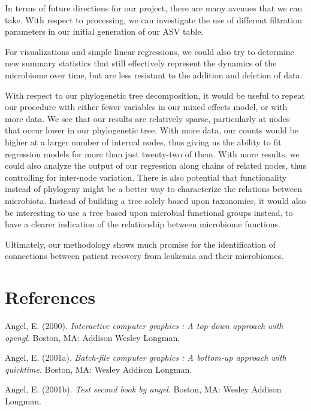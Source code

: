 \documentclass[12pt,twoside]{dukestatscithesis}
\begin{document}
In terms of future directions for our project, there are many avenues
that we can take. With respect to processing, we can investigate the use
of different filtration parameters in our initial generation of our ASV
table.

For visualizations and simple linear regressions, we could also try to
determine new summary statistics that still effectively represent the
dynamics of the microbiome over time, but are less resistant to the
addition and deletion of data.

With respect to our phylogenetic tree decomposition, it would be useful
to repeat our procedure with either fewer variables in our mixed effects
model, or with more data. We see that our results are relatively sparse,
particularly at nodes that occur lower in our phylogenetic tree. With
more data, our counts would be higher at a larger number of internal
nodes, thus giving us the ability to fit regression models for more than
just twenty-two of them. With more results, we could also analyze the
output of our regression along chains of related nodes, thus controlling
for inter-node variation. There is also potential that functionality
instead of phylogeny might be a better way to characterize the relations
between microbiota. Instead of building a tree solely based upon
taxonomies, it would also be interesting to use a tree based upon
microbial functional groups instead, to have a clearer indication of the
relationship between microbiome functions.

Ultimately, our methodology shows much promise for the identification of
connections between patient recovery from leukemia and their
microbiomes.

\backmatter

\chapter*{References}\label{references}


\noindent

\setlength{\parindent}{-0.20in} \setlength{\leftskip}{0.20in}
\setlength{\parskip}{8pt}

\hypertarget{refs}{}
\hypertarget{ref-angel2000}{}
Angel, E. (2000). \emph{Interactive computer graphics : A top-down
approach with opengl}. Boston, MA: Addison Wesley Longman.

\hypertarget{ref-angel2001}{}
Angel, E. (2001a). \emph{Batch-file computer graphics : A bottom-up
approach with quicktime}. Boston, MA: Wesley Addison Longman.

\hypertarget{ref-angel2002a}{}
Angel, E. (2001b). \emph{Test second book by angel}. Boston, MA: Wesley
Addison Longman.


\end{document}
